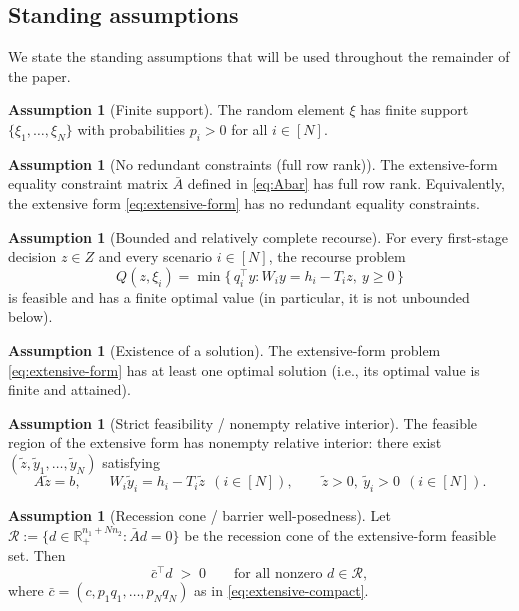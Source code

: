 \documentclass[11pt]{article}
\theoremstyle{plain}
\theoremstyle{definition}
\newtheorem{assumption}[theorem]{Assumption}
\theoremstyle{remark}
\newcommand{\R}{\mathbb{R}}
\begin{document}
\subsection{Standing assumptions}\label{subsec:assumptions}

We state the standing assumptions that will be used throughout the remainder of the paper.

\begin{assumption}[Finite support]\label{ass:finite-support}
The random element $\xi$ has finite support $\{\xi_1,\dots,\xi_N\}$ with probabilities $p_i>0$ for all $i\in[N]$.
\end{assumption}

\begin{assumption}[No redundant constraints (full row rank)]\label{ass:full-row-rank}
The extensive-form equality constraint matrix $\bar A$ defined in \eqref{eq:Abar} has full row rank.
Equivalently, the extensive form \eqref{eq:extensive-form} has no redundant equality constraints.
\end{assumption}

\begin{assumption}[Bounded and relatively complete recourse]\label{ass:recourse}
For every first-stage decision $z\in Z$ and every scenario $i\in[N]$, the recourse problem
\[
  Q(z,\xi_i)=\min\{\, q_i^\top y : W_i y = h_i - T_i z,\ y\ge 0 \,\}
\]
is feasible and has a finite optimal value (in particular, it is not unbounded below).
\end{assumption}

\begin{assumption}[Existence of a solution]\label{ass:existence}
The extensive-form problem \eqref{eq:extensive-form} has at least one optimal solution (i.e., its optimal
value is finite and attained).
\end{assumption}

\begin{assumption}[Strict feasibility / nonempty relative interior]\label{ass:ri-nonempty}
The feasible region of the extensive form has nonempty relative interior:
there exist $(\tilde z,\tilde y_1,\dots,\tilde y_N)$ satisfying
\[
  A\tilde z=b,\qquad W_i\tilde y_i = h_i - T_i\tilde z\ \ (i\in[N]),\qquad \tilde z>0,\ \tilde y_i>0\ \ (i\in[N]).
\]
\end{assumption}

\begin{assumption}[Recession cone / barrier well-posedness]\label{ass:recession}
Let $\mathcal R:=\{d\in\R^{n_1+Nn_2}_+ : \bar A d=0\}$ be the recession cone of the extensive-form feasible set.
Then
\[
  \bar c^\top d \;>\;0 \qquad \text{for all nonzero } d\in\mathcal R,
\]
where $\bar c=(c,p_1q_1,\dots,p_Nq_N)$ as in \eqref{eq:extensive-compact}.
\end{assumption}
\end{document}
